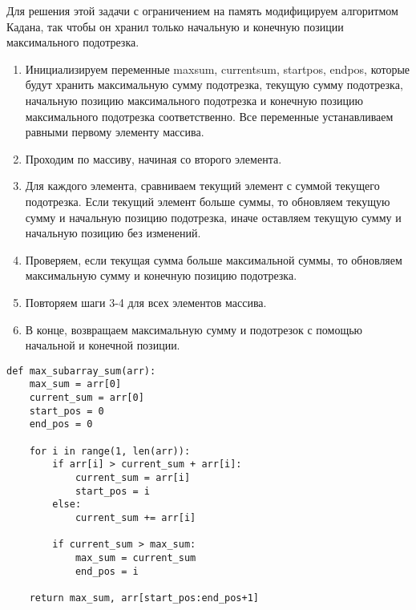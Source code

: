 Для решения этой задачи с ограничением на память модифицируем алгоритмом Кадана, так чтобы он хранил только начальную и конечную позиции максимального подотрезка.
\begin{enumerate}
\item Инициализируем переменные maxsum, currentsum, startpos, endpos, которые будут хранить максимальную сумму подотрезка, текущую сумму подотрезка, начальную позицию максимального подотрезка и конечную позицию максимального подотрезка соответственно. Все переменные устанавливаем равными первому элементу массива.
\item Проходим по массиву, начиная со второго элемента.
\item Для каждого элемента, сравниваем текущий элемент с суммой текущего подотрезка. Если текущий элемент больше суммы, то обновляем текущую сумму и начальную позицию подотрезка, иначе оставляем текущую сумму и начальную позицию без изменений.
\item Проверяем, если текущая сумма больше максимальной суммы, то обновляем максимальную сумму и конечную позицию подотрезка.
\item Повторяем шаги 3-4 для всех элементов массива.
\item В конце, возвращаем максимальную сумму и подотрезок с помощью начальной и конечной позиции.
\end{enumerate}

\begin{lstlisting}
def max_subarray_sum(arr):
	max_sum = arr[0]
	current_sum = arr[0]
	start_pos = 0
	end_pos = 0

	for i in range(1, len(arr)):
		if arr[i] > current_sum + arr[i]:
			current_sum = arr[i]
			start_pos = i
		else:
			current_sum += arr[i]

		if current_sum > max_sum:
			max_sum = current_sum
			end_pos = i

	return max_sum, arr[start_pos:end_pos+1]
\end{lstlisting}
